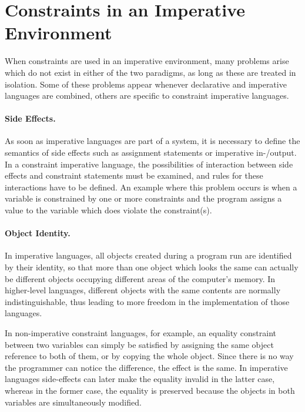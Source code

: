 \section{Constraints in an Imperative Environment}
\label{sec:constraints-in-an-imperative-environment}

When constraints are used in an imperative environment, many problems
arise which do not exist in either of the two paradigms, as long as
these are treated in isolation.  Some of these problems appear
whenever declarative and imperative languages are combined, others are
specific to constraint imperative languages.


\paragraph{Side Effects.}

As soon as imperative languages are part of a system, it is necessary
to define the semantics of side effects such as assignment statements
or imperative in-/output.  In a constraint imperative language, the
possibilities of interaction between side effects and constraint
statements must be examined, and rules for these interactions have to
be defined.  An example where this problem occurs is when a variable
is constrained by one or more constraints and the program assigns a
value to the variable which does violate the constraint(s).

\paragraph{Object Identity.}

In imperative languages, all objects created during a program run are
identified by their identity, so that more than one object which looks
the same can actually be different objects occupying different areas
of the computer's memory.  In higher-level languages, different
objects with the same contents are normally indistinguishable, thus
leading to more freedom in the implementation of those languages.

In non-imperative constraint languages, for example, an equality
constraint between two variables can simply be satisfied by assigning
the same object reference to both of them, or by copying the whole
object.  Since there is no way the programmer can notice the
difference, the effect is the same. In imperative languages
side-effects can later make the equality invalid in the latter case,
whereas in the former case, the equality is preserved because the
objects in both variables are simultaneously modified.

